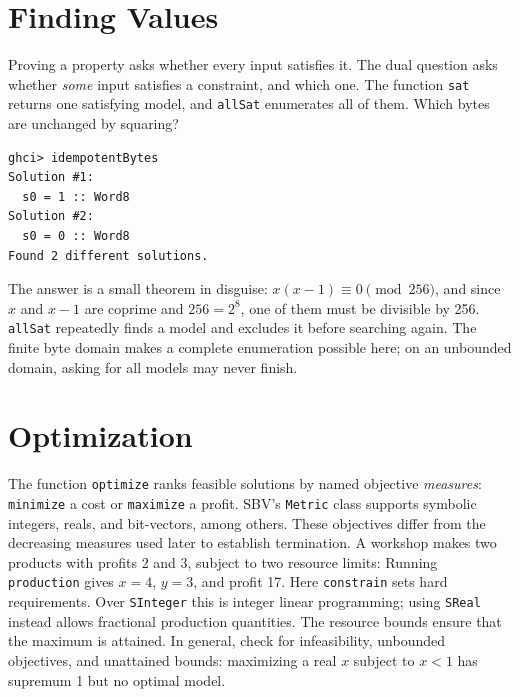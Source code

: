 \documentclass[acmsmall,screen,review,anonymous,nonacm]{acmart}
\newcommand{\code}[1]{\texttt{#1}}
\begin{document}
\section{Finding Values}
\label{sec:finding}

Proving a property asks whether every input satisfies it. The dual question asks
whether \emph{some} input satisfies a constraint, and which one. The function
\code{sat} returns one satisfying model, and \code{allSat} enumerates all of them.
Which bytes are unchanged by squaring?
\begin{lstlisting}[style=output]
ghci> idempotentBytes
Solution #1:
  s0 = 1 :: Word8
Solution #2:
  s0 = 0 :: Word8
Found 2 different solutions.
\end{lstlisting}
The answer is a small theorem in disguise: $x(x-1)\equiv 0 \pmod{256}$, and since
$x$ and $x-1$ are coprime and $256=2^8$, one of them must be divisible by 256.
\code{allSat} repeatedly finds a model and excludes it before searching again.
The finite byte domain makes a complete enumeration possible here; on an
unbounded domain, asking for all models may never finish.

\section{Optimization}
\label{sec:optimization}

The function \code{optimize} ranks feasible solutions by named objective
\emph{measures}: \code{minimize} a cost or \code{maximize} a profit.
SBV's \code{Metric} class supports symbolic integers, reals, and bit-vectors,
among others. These objectives differ from the decreasing measures used later
to establish termination.
A workshop makes two products with profits 2 and 3, subject to two resource
limits:
Running \code{production} gives $x=4$, $y=3$, and profit 17.
Here \code{constrain} sets hard requirements. Over \code{SInteger} this is integer linear programming;
using \code{SReal} instead allows fractional production quantities. The resource
bounds ensure that the maximum is attained. In general, check for infeasibility,
unbounded objectives, and unattained bounds: maximizing a real $x$ subject to
$x<1$ has supremum 1 but no optimal model.
\end{document}
